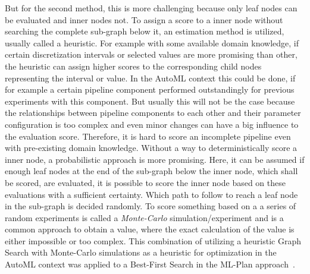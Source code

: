But for the second method, this is more challenging because only leaf nodes can be evaluated and inner nodes not.
To assign a score to a inner node without searching the complete sub-graph below it, an estimation method is utilized, usually called a heuristic.\newline
For example with some available domain knowledge, if certain discretization intervals or selected values are more promising than other, the heuristic can assign higher scores to the corresponding child nodes representing the interval or value.
In the AutoML context this could be done, if for example a certain pipeline component performed outstandingly for previous experiments with this component.
But usually this will not be the case because the relationships between pipeline components to each other and their parameter configuration is too complex and even minor changes can have a big influence to the evaluation score.
Therefore, it is hard to score an incomplete pipeline even with pre-existing domain knowledge.\newline
Without a way to deterministically score a inner node, a probabilistic approach is more promising.
Here, it can be assumed if enough leaf nodes at the end of the sub-graph below the inner node, which shall be scored, are evaluated, it is possible to score the inner node based on these evaluations with a sufficient certainty.
Which path to follow to reach a leaf node in the sub-graph is decided randomly.
To score something based on a a series of random experiments is called a \textit{Monte-Carlo} simulation/experiment and is a common approach to obtain a value, where the exact calculation of the value is either impossible or too complex.
This combination of utilizing a heuristic Graph Search with Monte-Carlo simulations as a heuristic for optimization in the AutoML context was applied to a Best-First Search in the ML-Plan approach~\cite{Mohr-ML-Plan}.

